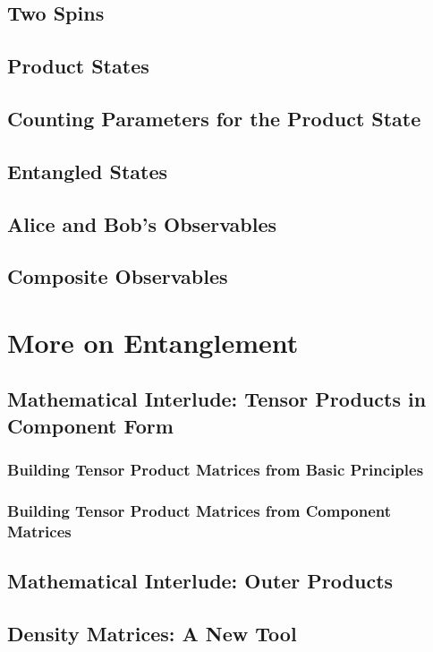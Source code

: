 \documentclass[a4paper]{article}
\begin{document}
\subsection{Two Spins}
\subsection{Product States}

\subsection{Counting Parameters for the Product State}
\subsection{Entangled States}

\subsection{Alice and Bob's Observables}


\subsection{Composite Observables}





\section{More on Entanglement}
\subsection{Mathematical Interlude: Tensor Products in Component Form}
\subsubsection{Building Tensor Product Matrices from Basic Principles}
\subsubsection{Building Tensor Product Matrices from Component Matrices}
%
%
%
\subsection{Mathematical Interlude: Outer Products}
\subsection{Density Matrices: A New Tool}
\end{document}
